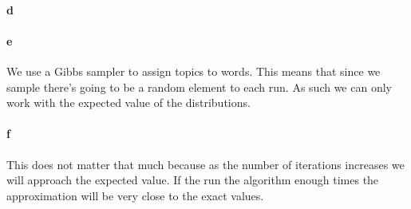 \documentclass{article}
\begin{document}
\paragraph{d}
\paragraph{e}

We use a Gibbs sampler to assign topics to words. This means that since we
sample there's going to be a random element to each run. As such we can only
work with the expected value of the distributions.

\paragraph{f}

This does not matter that much because as the number of iterations increases we
will approach the expected value. If the run the algorithm enough times the
approximation will be very close to the exact values.
\end{document}
